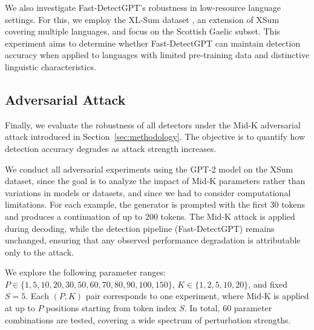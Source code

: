 \documentclass[11pt]{article}
\begin{document}
We also investigate Fast-DetectGPT’s robustness in low-resource language settings. For this, we employ the XL-Sum dataset \cite{xlsum}, an extension of XSum covering multiple languages, and focus on the Scottish Gaelic subset. This experiment aims to determine whether Fast-DetectGPT can maintain detection accuracy when applied to languages with limited pre-training data and distinctive linguistic characteristics.

\subsection{Adversarial Attack}

Finally, we evaluate the robustness of all detectors under the Mid-K adversarial attack introduced in Section~\ref{sec:methodology}. The objective is to quantify how detection accuracy degrades as attack strength increases.

We conduct all adversarial experiments using the GPT-2 model on the XSum dataset, since the goal is to analyze the impact of Mid-K parameters rather than variations in models or datasets, and since we had to consider computational limitations. For each example, the generator is prompted with the first 30 tokens and produces a continuation of up to 200 tokens. The Mid-K attack is applied during decoding, while the detection pipeline (Fast-DetectGPT) remains unchanged, ensuring that any observed performance degradation is attributable only to the attack.


We explore the following parameter ranges: $P \in \{1,5,10,20,30,50,60,70,80,90,100,150\}$,  $K \in \{1,2,5,10,20\}$, and fixed $S=5$. Each $(P, K)$ pair corresponds to one experiment, where Mid-K is applied at up to $P$ positions starting from token index $S$. In total, 60 parameter combinations are tested, covering a wide spectrum of perturbation strengths.

\end{document}
